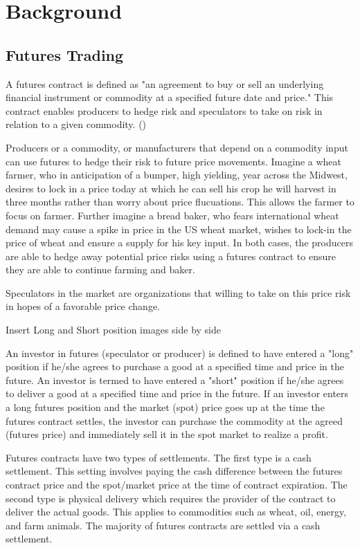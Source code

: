 \documentclass[twoside,11pt]{article}
\begin{document}
\section{Background} \label{background}

\subsection{Futures Trading}
	A futures contract is defined as "an agreement to buy or sell an underlying financial instrument or commodity at a specified future date and price." This contract enables producers to hedge risk and speculators to take on risk in relation to a given commodity. (\cite{InvestopediaF})
	
  Producers or a commodity, or manufacturers that depend on a commodity input can use futures to hedge their risk to future price movements. Imagine a wheat farmer, who in anticipation of a bumper, high yielding, year across the Midwest, desires to lock in a price today at which he can sell his crop he will harvest in three months rather than worry about price flucuations.  This allows the farmer to focus on farmer. Further imagine a bread baker, who fears international wheat demand may cause a spike in price in the US wheat market, wishes to lock-in the price of wheat and ensure a supply for his key input. In both cases, the producers are able to hedge away potential price risks using a futures contract to ensure they are able to continue farming and baker.
  
  Speculators in the market are organizations that willing to take on this price risk in hopes of a favorable price change.

  Insert Long and Short position images side by side

  An investor in futures (speculator or producer) is defined to have entered a "long" position if he/she agrees to purchase a good at a specified time and price in the future. An investor is termed to have entered a "short" position if he/she agrees to deliver a good at a specified time and price in the future. If an investor enters a long futures position and the market (spot) price goes up at the time the futures contract settles, the investor can purchase the commodity at the agreed (futures price) and immediately sell it in the spot market to realize a profit. 
  
  Futures contracts have two types of settlements. The first type is a cash settlement. This setting involves paying the cash difference between the futures contract price and the spot/market price at the time of contract expiration. The second type is physical delivery which requires the provider of the contract to deliver the actual goods. This applies to commodities such as wheat, oil, energy, and farm animals. The majority of futures contracts are settled via a cash settlement.
  
\end{document}

